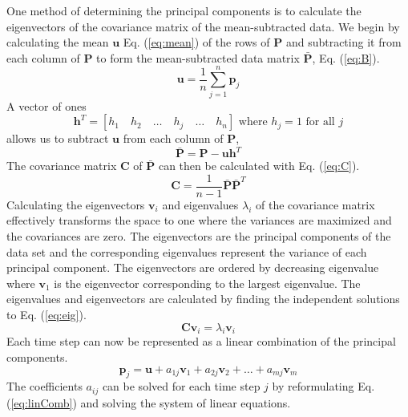 \documentclass[smallextended]{svjour3}     %
\begin{document}
One method of determining the principal components is to calculate the
eigenvectors of the covariance matrix of the mean-subtracted data. We begin by
calculating the mean $\mathbf{u}$ Eq. (\ref{eq:mean}) of the rows of $\mathbf{P}$ and
subtracting it from each column of $\mathbf{P}$ to form the mean-subtracted
data matrix $\bar{\mathbf{P}}$, Eq. (\ref{eq:B}).
\begin{equation}
    \mathbf{u}=\frac{1}{n}\sum_{j=1}^n\mathbf{p}_j
    \label{eq:mean}
\end{equation}
A vector of ones
\begin{displaymath}
    \mathbf{h}^T=\left[h_1\quad h_2\quad\ldots\quad h_j\quad\ldots\quad h_n\right]
    \textrm{ where }h_j=1\textrm{ for all }j
    \label{eq:h}
\end{displaymath}
allows us to subtract $\mathbf{u}$ from each column of $\mathbf{P}$,
\begin{equation}
    \bar{\mathbf{P}}=\mathbf{P}-\mathbf{u}\mathbf{h}^T
    \label{eq:B}
\end{equation}
The covariance matrix $\mathbf{C}$ of $\bar{\mathbf{P}}$ can then be calculated with
Eq. (\ref{eq:C}).
\begin{equation}
    \mathbf{C}=\frac{1}{n-1}\bar{\mathbf{P}}\bar{\mathbf{P}}^T
    \label{eq:C}
\end{equation}
Calculating the eigenvectors $\mathbf{v}_i$ and eigenvalues $\lambda_i$ of the
covariance matrix effectively transforms the space to one where the variances
are maximized and the covariances are zero. The eigenvectors are the principal
components of the data set and the corresponding eigenvalues represent the
variance of each principal component. The eigenvectors are ordered by
decreasing eigenvalue where $\mathbf{v}_1$ is the eigenvector corresponding to
the largest eigenvalue. The eigenvalues and eigenvectors are calculated by
finding the independent solutions to Eq. (\ref{eq:eig}).
\begin{equation}
    \mathbf{C}\mathbf{v}_i=\lambda_i\mathbf{v}_i
    \label{eq:eig}
\end{equation}
Each time step can now be represented as a linear combination of the principal
components.
\begin{equation}
    \mathbf{p}_j=\mathbf{u}+a_{1j}\mathbf{v}_1+a_{2j}\mathbf{v}_2+\ldots+a_{mj}\mathbf{v}_m
    \label{eq:linComb}
\end{equation}
The coefficients $a_{ij}$ can be solved for each time step $j$ by reformulating
Eq. (\ref{eq:linComb}) and solving the system of linear equations.
\end{document}
